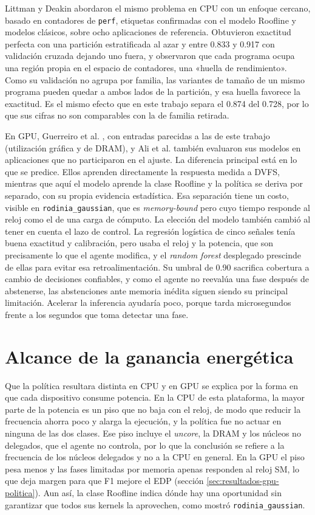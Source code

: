 Littman y Deakin \cite{Littman2025} abordaron el mismo problema en CPU con un enfoque cercano, basado en contadores de \texttt{perf}, etiquetas confirmadas con el modelo Roofline y modelos clásicos, sobre ocho aplicaciones de referencia. Obtuvieron exactitud perfecta con una partición estratificada al azar y entre 0.833 y 0.917 con validación cruzada dejando uno fuera, y observaron que cada programa ocupa una región propia en el espacio de contadores, una «huella de rendimiento». Como su validación no agrupa por familia, las variantes de tamaño de un mismo programa pueden quedar a ambos lados de la partición, y esa huella favorece la exactitud. Es el mismo efecto que en este trabajo separa el 0.874 del 0.728, por lo que sus cifras no son comparables con la de familia retirada.

En GPU, Guerreiro et al. \cite{Guerreiro2019}, con entradas parecidas a las de este trabajo (utilización gráfica y de DRAM), y Ali et al. \cite{Ali2023} también evaluaron sus modelos en aplicaciones que no participaron en el ajuste. La diferencia principal está en lo que se predice. Ellos aprenden directamente la respuesta medida a DVFS, mientras que aquí el modelo aprende la clase Roofline y la política se deriva por separado, con su propia evidencia estadística. Esa separación tiene un costo, visible en \texttt{rodinia\_gaussian}, que es \textit{memory-bound} pero cuyo tiempo responde al reloj como el de una carga de cómputo. La elección del modelo también cambió al tener en cuenta el lazo de control. La regresión logística de cinco señales tenía buena exactitud y calibración, pero usaba el reloj y la potencia, que son precisamente lo que el agente modifica, y el \textit{random forest} desplegado prescinde de ellas para evitar esa retroalimentación. Su umbral de 0.90 sacrifica cobertura a cambio de decisiones confiables, y como el agente no reevalúa una fase después de abstenerse, las abstenciones ante memoria inédita siguen siendo su principal limitación. Acelerar la inferencia ayudaría poco, porque tarda microsegundos frente a los segundos que toma detectar una fase.

\section{Alcance de la ganancia energética}

Que la política resultara distinta en CPU y en GPU se explica por la forma en que cada dispositivo consume potencia. En la CPU de esta plataforma, la mayor parte de la potencia es un piso que no baja con el reloj, de modo que reducir la frecuencia ahorra poco y alarga la ejecución, y la política fue no actuar en ninguna de las dos clases. Ese piso incluye el \textit{uncore}, la DRAM y los núcleos no delegados, que el agente no controla, por lo que la conclusión se refiere a la frecuencia de los núcleos delegados y no a la CPU en general. En la GPU el piso pesa menos y las fases limitadas por memoria apenas responden al reloj SM, lo que deja margen para que F1 mejore el EDP (sección \ref{sec:resultados-gpu-politica}). Aun así, la clase Roofline indica dónde hay una oportunidad sin garantizar que todos sus kernels la aprovechen, como mostró \texttt{rodinia\_gaussian}.

